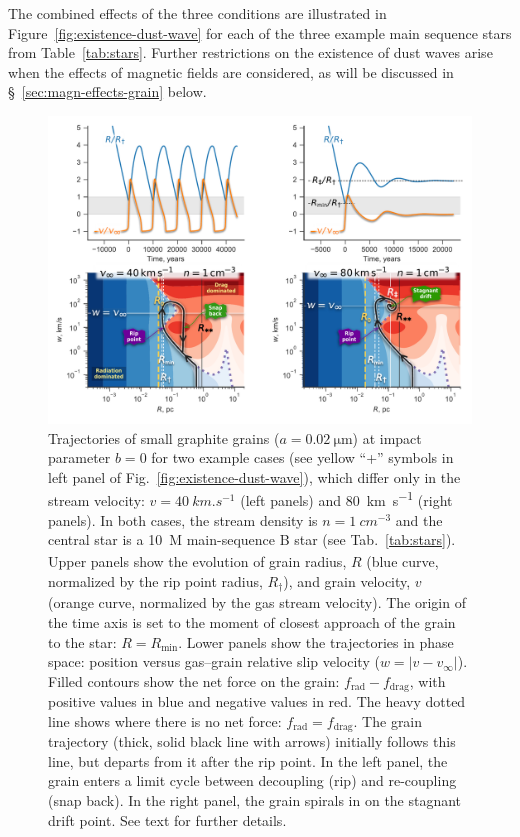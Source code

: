 \message{ !name(dusty-bow-wave.tex)}\documentclass[useAMS, usenatbib, a4paper]{mnras}
\providecommand{\abs}[1]{\lvert#1\rvert}
\newcommand\drag{\ensuremath{_{\text{drag}}}}
\newcommand\rad{\ensuremath{_{\text{rad}}}}
\newcommand\Rmin{\ensuremath{R_{\scriptscriptstyle\text{min}}}}
\begin{document}
The combined effects of the three conditions are illustrated in
Figure~\ref{fig:existence-dust-wave} for each of the three example
main sequence stars from Table~\ref{tab:stars}.  Further restrictions
on the existence of dust waves arise when the effects of magnetic
fields are considered, as will be discussed in
\S~\ref{sec:magn-effects-grain} below.

\begin{figure}
  \centering
  \includegraphics[width=\linewidth]{figs/dust-wave-phase-trajectories-annotate}
  \caption{Trajectories of small graphite grains
    (\(a = \SI{0.02}{\um}\)) at impact parameter \(b = 0\) for two
    example cases (see yellow ``+'' symbols in left panel of
    Fig.~\ref{fig:existence-dust-wave}), which differ only in the
    stream velocity: \(v = \SI{40}{km.s^{-1}}\) (left panels) and
    \SI{80}{km.s^{-1}} (right panels).  In both cases, the stream
    density is \(n = \SI{1}{cm^{-3}}\) and the central star is a
    \SI{10}{M_\odot} main-sequence B star (see Tab.~\ref{tab:stars}).
    Upper panels show the evolution of grain radius, \(R\) (blue
    curve, normalized by the rip point radius, \(R_\dag\)), and grain
    velocity, \(v\) (orange curve, normalized by the gas stream
    velocity).  The origin of the time axis is set to the moment of
    closest approach of the grain to the star: \(R = \Rmin\).  Lower
    panels show the trajectories in phase space: position versus
    gas--grain relative slip velocity (\(w = \abs{v - v_\infty}\)).  Filled
    contours show the net force on the grain: \(f\rad - f\drag\), with
    positive values in blue and negative values in red.  The heavy
    dotted line shows where there is no net force: \(f\rad = f\drag\).
    The grain trajectory (thick, solid black line with arrows)
    initially follows this line, but departs from it after the rip
    point. In the left panel, the grain enters a limit cycle between
    decoupling (rip) and re-coupling (snap back).  In the right panel,
    the grain spirals in on the stagnant drift point.  See text for
    further details.}
    \label{fig:phase-space-trajectories}
\end{figure}
\end{document}
